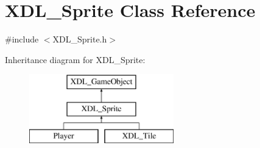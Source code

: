 \hypertarget{class_x_d_l___sprite}{\section{X\-D\-L\-\_\-\-Sprite Class Reference}
\label{class_x_d_l___sprite}
}


{\ttfamily \#include $<$X\-D\-L\-\_\-\-Sprite.\-h$>$}

Inheritance diagram for X\-D\-L\-\_\-\-Sprite\-:\begin{figure}[H]
\begin{center}
\leavevmode
\includegraphics[height=3.000000cm]{class_x_d_l___sprite}
\end{center}
\end{figure}
